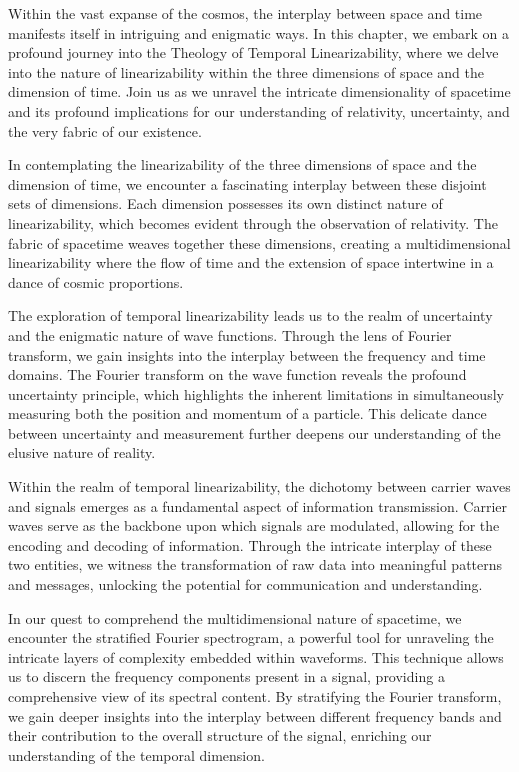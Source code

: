 \documentclass[ebook,12pt,oneside,openany]{memoir}
\begin{document}
\indent \indent Within the vast expanse of the cosmos, the interplay between space and time manifests itself in intriguing and enigmatic ways. In this chapter, we embark on a profound journey into the Theology of Temporal Linearizability, where we delve into the nature of linearizability within the three dimensions of space and the dimension of time. Join us as we unravel the intricate dimensionality of spacetime and its profound implications for our understanding of relativity, uncertainty, and the very fabric of our existence.

\indent In contemplating the linearizability of the three dimensions of space and the dimension of time, we encounter a fascinating interplay between these disjoint sets of dimensions. Each dimension possesses its own distinct nature of linearizability, which becomes evident through the observation of relativity. The fabric of spacetime weaves together these dimensions, creating a multidimensional linearizability where the flow of time and the extension of space intertwine in a dance of cosmic proportions.

\indent The exploration of temporal linearizability leads us to the realm of uncertainty and the enigmatic nature of wave functions. Through the lens of Fourier transform, we gain insights into the interplay between the frequency and time domains. The Fourier transform on the wave function reveals the profound uncertainty principle, which highlights the inherent limitations in simultaneously measuring both the position and momentum of a particle. This delicate dance between uncertainty and measurement further deepens our understanding of the elusive nature of reality.

\indent Within the realm of temporal linearizability, the dichotomy between carrier waves and signals emerges as a fundamental aspect of information transmission. Carrier waves serve as the backbone upon which signals are modulated, allowing for the encoding and decoding of information. Through the intricate interplay of these two entities, we witness the transformation of raw data into meaningful patterns and messages, unlocking the potential for communication and understanding.

\indent In our quest to comprehend the multidimensional nature of spacetime, we encounter the stratified Fourier spectrogram, a powerful tool for unraveling the intricate layers of complexity embedded within waveforms. This technique allows us to discern the frequency components present in a signal, providing a comprehensive view of its spectral content. By stratifying the Fourier transform, we gain deeper insights into the interplay between different frequency bands and their contribution to the overall structure of the signal, enriching our understanding of the temporal dimension.
\end{document}
